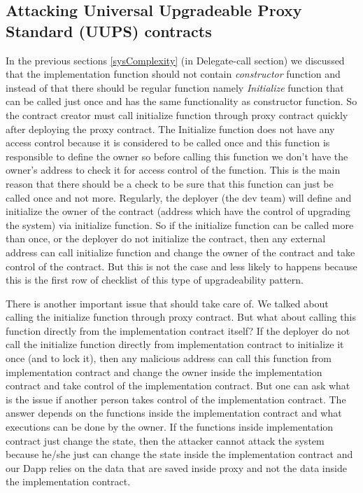 \subsection{Attacking Universal Upgradeable Proxy Standard (UUPS) contracts}
In the previous sections \ref{sysComplexity} (in Delegate-call section) we discussed that the implementation function should not contain \textit{constructor} function and instead of that there should be regular function namely \textit{Initialize} function that can be called just once and has the same functionality as constructor function. So the contract creator must call initialize function through proxy contract quickly after deploying the proxy contract. The Initialize function does not have any access control because it is considered to be called once and this function is responsible to define the owner so before calling this function we don't have the owner's address to check it for access control of the function. This is the main reason that there should be a check to be sure that this function can just be called once and not more. Regularly, the deployer (the dev team) will define and initialize the owner of the contract (address which have the control of upgrading the system) via initialize function. So if the initialize function can be called more than once, or the deployer do not initialize the contract, then any external address can call initialize function and change the owner of the contract and take control of the contract. But this is not the case and less likely to happens because this is the first row of checklist of this type of upgradeability pattern.

There is another important issue that should take care of. We talked about calling the initialize function through proxy contract. But what about calling this function directly from the implementation contract itself? If the deployer do not call the initialize function directly from implementation contract to initialize it once (and to lock it), then any malicious address can call this function from implementation contract and change the owner inside the implementation contract and take control of the implementation contract. But one can ask what is the issue if another person takes control of the implementation contract. The answer depends on the functions inside the implementation contract and what executions can be done by the owner. If the functions inside implementation contract just change the state, then the attacker cannot attack the system because he/she just can change the state inside the implementation contract and our Dapp relies on the data that are saved inside proxy and not the data inside the implementation contract.

